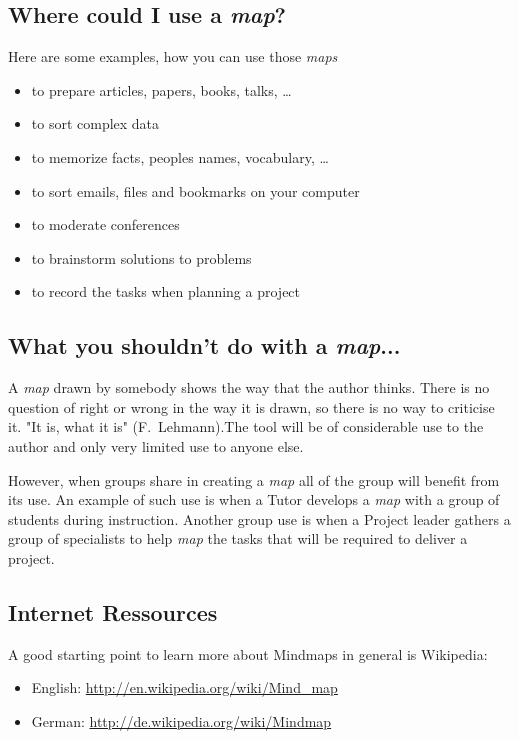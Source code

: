 \documentclass[12pt,a4paper]{article}
\begin{document}
\subsection{Where could I use a {\em map}?}
Here are some examples, how you can use those {\em maps}
\begin{itemize}
    \item to prepare articles, papers, books, talks, \ldots
    \item to sort complex data
    \item to memorize facts, peoples names, vocabulary, \ldots
    \item to sort emails, files and bookmarks on your computer
    \item to moderate conferences
    \item to brainstorm solutions to problems
    \item to record the tasks when planning a project
\end{itemize}

\subsection{What you shouldn't do with a {\em map}...}
A {\em map} drawn by somebody shows the way that the author thinks. There is
no question of right or wrong in the way it is drawn, so there is no way to criticise
it. "It is, what it is" ({\sc F.~Lehmann}).The tool will be of considerable use to the author and only very limited use to anyone else. 

However, when groups share in creating a {\em map} all of the group will benefit from its use. An example of such use is when a Tutor develops a {\em map} with a group of students during instruction. Another group use is when a Project leader gathers a group of specialists to help {\em map} the tasks that will be required to deliver a project.


\subsection{Internet Ressources} 
A good starting point to learn more about Mindmaps in general is Wikipedia:
\begin{itemize}
	\item English: 
		\href{http://en.wikipedia.org/wiki/Mind_map}{http://en.wikipedia.org/wiki/Mind\_map}
	\item German: 
		\href{http://de.wikipedia.org/wiki/Mindmap}{http://de.wikipedia.org/wiki/Mindmap}
\end{itemize}
\end{document}
